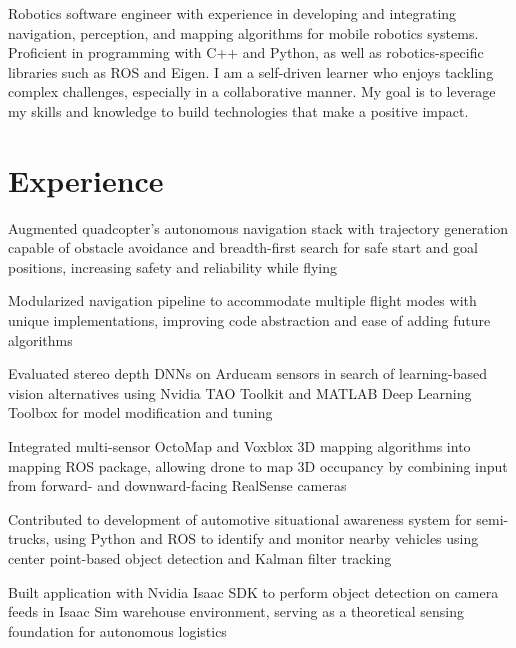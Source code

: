\documentclass{resume}
\begin{document}


\begin{personalstatement}
    Robotics software engineer with experience in developing and integrating navigation, perception, and mapping algorithms for mobile robotics systems. Proficient in programming with C++ and Python, as well as robotics-specific libraries such as ROS and Eigen. I am a self-driven learner who enjoys tackling complex challenges, especially in a collaborative manner. My goal is to leverage my skills and knowledge to build technologies that make a positive impact.
\end{personalstatement}
    
\section{Experience}

\begin{details}
    \item Augmented quadcopter’s autonomous navigation stack with trajectory generation capable of obstacle avoidance and breadth-first search for safe start and goal positions, increasing safety and reliability while flying
    \item Modularized navigation pipeline to accommodate multiple flight modes with unique implementations, improving code abstraction and ease of adding future algorithms
    \item Evaluated stereo depth DNNs on Arducam sensors in search of learning-based vision alternatives using Nvidia TAO Toolkit and MATLAB Deep Learning Toolbox for model modification and tuning
    \item Integrated multi-sensor OctoMap and Voxblox 3D mapping algorithms into mapping ROS package, allowing drone to map 3D occupancy by combining input from forward- and downward-facing RealSense cameras
\end{details}

\begin{details}
    \item Contributed to development of automotive situational awareness system for semi-trucks, using Python and ROS to identify and monitor nearby vehicles using center point-based object detection and Kalman filter tracking
    \item Built application with Nvidia Isaac SDK to perform object detection on camera feeds in Isaac Sim warehouse environment, serving as a theoretical sensing foundation for autonomous logistics
\end{details}
\end{document}
